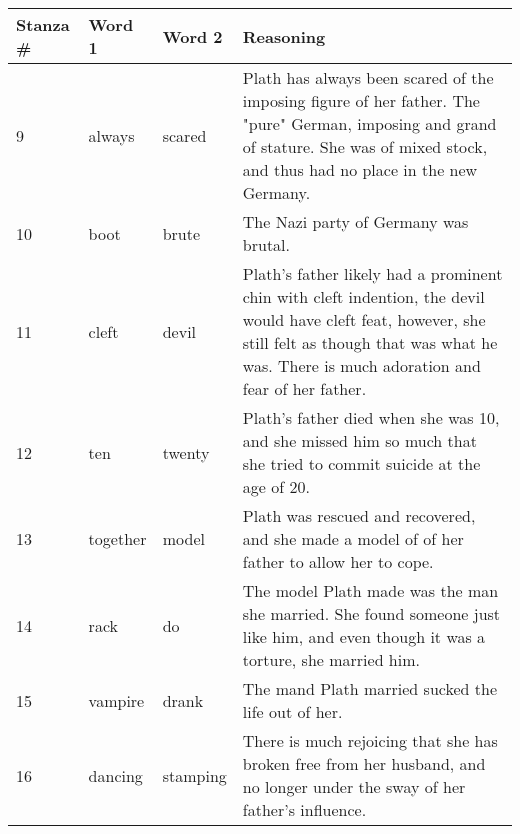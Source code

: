 \documentclass[a4paper,12pt]{article}
\begin{document}
\begin{center}
	\begin{tabular}{|l|l|l|p{2.5in}|}
	\hline
	Stanza \#& Word 1 & Word 2 & Reasoning \\ \hline	9&always&scared&Plath has always been scared of the imposing figure of her father. The "pure" German, imposing and grand of stature.  She was of mixed stock, and thus had no place in the new Germany.\\ \hline
	10&boot&brute&The Nazi party of Germany was brutal.\\ \hline
	11&cleft&devil&Plath's father likely had a prominent chin with cleft indention, the devil would have cleft feat, however, she still felt as though that was what he was.  There is much adoration and fear of her father.\\ \hline
	12&ten&twenty&Plath's father died when she was 10, and she missed him so much that she tried to commit suicide at the age of 20.\\ \hline
	13&together&model&Plath was rescued and recovered, and she made a model of of her father to allow her to cope.\\ \hline
	14&rack&do&The model Plath made was the man she married.  She found someone just like him, and even though it was a torture, she married him.\\ \hline
	15&vampire&drank&The mand Plath married sucked the life out of her.\\ \hline
	16&dancing&stamping&There is much rejoicing that she has broken free from her husband, and no longer under the sway of her father's influence.\\ \hline
	\end{tabular}
\end{center}  
\end{document}
